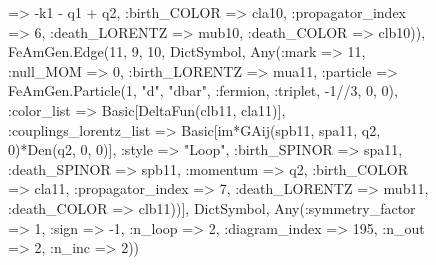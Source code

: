 \documentclass{revtex4}
\begin{document}
\begin{figure}[!htb]
\begin{center}
{=> -k1 - q1 + q2, :birth_COLOR => cla10, :propagator_index => 6, :death_LORENTZ => mub10, :death_COLOR => clb10)), FeAmGen.Edge(11, 9, 10, Dict{Symbol, Any}(:mark => 11, :null_MOM => 0, :birth_LORENTZ => mua11, :particle => FeAmGen.Particle(1, "d", "dbar", :fermion, :triplet, -1//3, 0, 0), :color_list => Basic[DeltaFun(clb11, cla11)], :couplings_lorentz_list => Basic[im*GAij(spb11, spa11, q2, 0)*Den(q2, 0, 0)], :style => "Loop", :birth_SPINOR => spa11, :death_SPINOR => spb11, :momentum => q2, :birth_COLOR => cla11, :propagator_index => 7, :death_LORENTZ => mub11, :death_COLOR => clb11))], Dict{Symbol, Any}(:symmetry_factor => 1, :sign => -1, :n_loop => 2, :diagram_index => 195, :n_out => 2, :n_inc => 2)) 
}
\end{center}
\end{figure}
\end{document}
